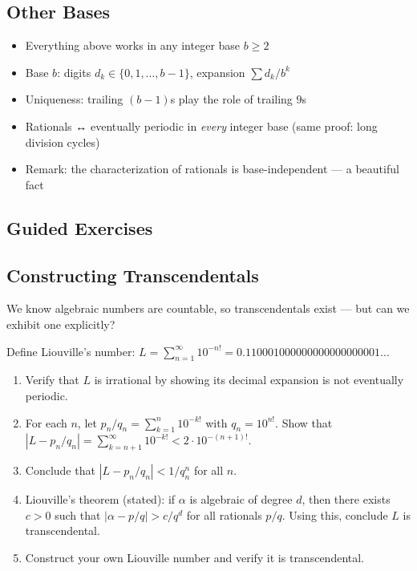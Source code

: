 \documentclass[
  10pt,
  letterpaper,
]{scrbook}
\providecommand{\tightlist}{%
  \setlength{\itemsep}{0pt}\setlength{\parskip}{0pt}}
\begin{document}
\subsection{Other Bases}\label{other-bases}

\begin{itemize}
\tightlist
\item
  Everything above works in any integer base \(b \geq 2\)
\item
  Base \(b\): digits \(d_k \in \{0, 1, \ldots, b-1\}\), expansion
  \(\sum d_k / b^k\)
\item
  Uniqueness: trailing \((b-1)\)s play the role of trailing \(9\)s
\item
  Rationals ↔ eventually periodic in \emph{every} integer base (same
  proof: long division cycles)
\item
  Remark: the characterization of rationals is base-independent --- a
  beautiful fact
\end{itemize}

\subsection{Guided Exercises}\label{guided-exercises-5}

\subsection{Constructing
Transcendentals}\label{constructing-transcendentals}

We know algebraic numbers are countable, so transcendentals exist ---
but can we exhibit one explicitly?

Define Liouville's number:
\(L = \sum_{n=1}^{\infty} 10^{-n!} = 0.110001000000000000000001\ldots\)

\begin{enumerate}
\def\labelenumi{(\alph{enumi})}
\item
  Verify that \(L\) is irrational by showing its decimal expansion is
  not eventually periodic.
\item
  For each \(n\), let \(p_n/q_n = \sum_{k=1}^{n} 10^{-k!}\) with
  \(q_n = 10^{n!}\). Show that
  \(|L - p_n/q_n| = \sum_{k=n+1}^{\infty} 10^{-k!} < 2 \cdot 10^{-(n+1)!}\).
\item
  Conclude that \(|L - p_n/q_n| < 1/q_n^n\) for all \(n\).
\item
  Liouville's theorem (stated): if \(\alpha\) is algebraic of degree
  \(d\), then there exists \(c > 0\) such that
  \(|\alpha - p/q| > c/q^d\) for all rationals \(p/q\). Using this,
  conclude \(L\) is transcendental.
\item
  Construct your own Liouville number and verify it is transcendental.
\end{enumerate}
\end{document}
